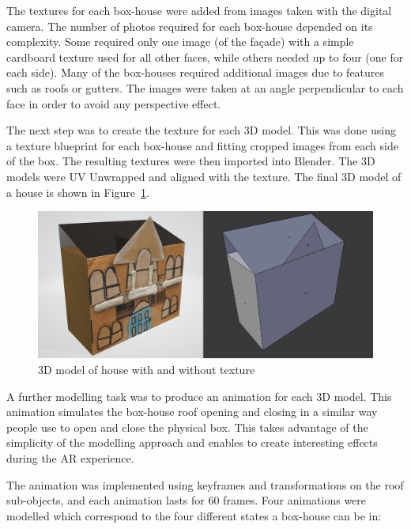 \documentclass[acmlarge,screen,dvipsnames]{acmart}
\begin{document}
The textures for each box-house were added from images taken with the digital
camera. The number of photos required for each box-house depended on its complexity. Some required only one image (of the fa\c{c}ade) with a simple
 cardboard texture used for all other faces, while others needed up to four
 (one for each side). Many of the box-houses required additional images due to
 features such as roofs or gutters. The images were taken at an angle
 perpendicular to each face in order to avoid any perspective effect. 



The next step was to create the
texture for each 3D model. This was done using a texture blueprint for each box-house and fitting cropped images from each side of the box. The resulting
textures were then imported into Blender. The 3D models were UV Unwrapped and
aligned with the texture. The final 3D model of a house is shown in
Figure~\ref{fig:3Dhouse}. 

\begin{figure}[ht] \centering
\includegraphics[width=\linewidth]{images/models.PNG} \caption{3D model
of house with and without texture} \label{fig:3Dhouse} 
\end{figure}

A further modelling task was to produce an animation for each 3D model. This
animation simulates the box-house roof opening and closing in a similar way people use to open and close the physical box. This takes advantage of the simplicity of the modelling approach and enables to create interesting effects during the AR experience.

The animation was implemented using
keyframes and transformations on the roof sub-objects, and each animation
lasts for 60 frames. Four animations were modelled which correspond to the
four different states a box-house can be in: 
\end{document}
